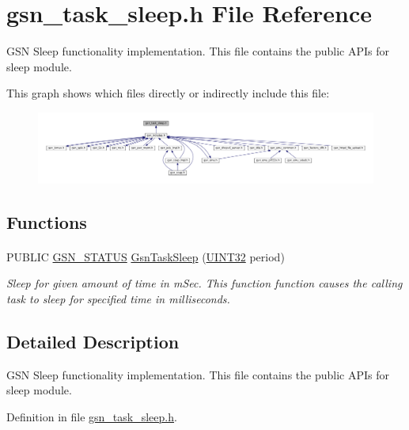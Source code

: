 \hypertarget{a00597}{
\section{gsn\_\-task\_\-sleep.h File Reference}
\label{a00597}
}


GSN Sleep functionality implementation. This file contains the public APIs for sleep module.  


This graph shows which files directly or indirectly include this file:
\nopagebreak
\begin{figure}[H]
\begin{center}
\leavevmode
\includegraphics[width=400pt]{a00843}
\end{center}
\end{figure}
\subsection*{Functions}
\paragraph*{}
\begin{DoxyCompactItemize}
\item 
PUBLIC \hyperlink{a00660_gada5951904ac6110b1fa95e51a9ddc217}{GSN\_\-STATUS} \hyperlink{a00676_ga365e30b1ad7fac264343ca6217816486}{GsnTaskSleep} (\hyperlink{a00660_gae1e6edbbc26d6fbc71a90190d0266018}{UINT32} period)
\begin{DoxyCompactList}\small\item\em Sleep for given amount of time in mSec. This function function causes the calling task to sleep for specified time in milliseconds. \end{DoxyCompactList}\end{DoxyCompactItemize}



\subsection{Detailed Description}
GSN Sleep functionality implementation. This file contains the public APIs for sleep module. 

Definition in file \hyperlink{a00597_source}{gsn\_\-task\_\-sleep.h}.

